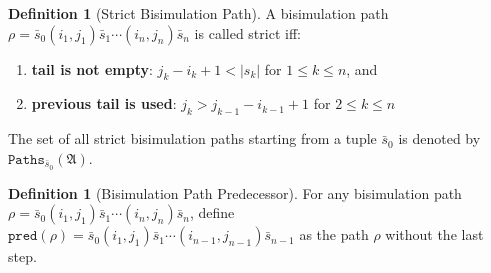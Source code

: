 \documentclass[draft]{scrartcl}
\theoremstyle{definition}
\newtheorem{definition}[theorem]{Definition}
\begin{document}
\begin{definition}[Strict Bisimulation Path]
  A bisimulation path $\rho = \bar{s}_{0}(i_{1}, j_{1})\bar{s}_{1}\cdots{}(i_{n}, j_{n})\bar{s}_{n}$ is called strict iff:

  \begin{enumerate}
    \item \textbf{tail is not empty}: $j_{k}-i_{k}+1 < |s_{k}|$ for $1 \le k \le n$, and
    \item \textbf{previous tail is used}: $j_{k} > j_{k-1}-i_{k-1} + 1$ for $2 \le k \le n$
  \end{enumerate}

  The set of all strict bisimulation paths starting from a tuple $\bar{s}_{0}$ is denoted by $\mathtt{Paths}_{\bar{s}_{0}}(\mathfrak{A})$.
\end{definition}

\begin{definition}[Bisimulation Path Predecessor]
  For any bisimulation path $\rho = \bar{s}_{0}(i_{1}, j_{1})\bar{s}_{1}\cdots{}(i_{n}, j_{n})\bar{s}_{n}$, define $\mathtt{pred}(\rho) = \bar{s}_{0}(i_{1}, j_{1})\bar{s}_{1}\cdots{}(i_{n-1}, j_{n-1})\bar{s}_{n-1}$ as the path $\rho$ without the last step.
\end{definition}
\end{document}

